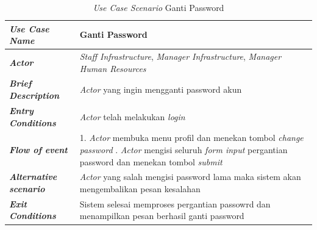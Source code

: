 \begin{longtable}{ |p{6cm}|p{8cm}|}
\caption{\textit{Use Case Scenario} Ganti Password}\label{tab:use-case-scenario-ganti-password} 
\\
\hline
\textbf{\textit{Use Case Name}}
&Ganti Password
\\ \hline

\textbf{\textit{Actor}}
&\textit{Staff Infrastructure}, \textit{Manager Infrastructure}, \textit{Manager Human Resources}
\\ \hline

\textbf{\textit{Brief Description}}
&\textit{Actor} yang ingin mengganti password akun
\\ \hline

\textbf{\textit{Entry Conditions}}
&\textit{Actor} telah melakukan \textit{login}
\\ \hline

\textbf{\textit{Flow of event}}
&1. \textit{Actor} membuka menu profil dan menekan tombol \textit{change password}
\newline
2. \textit{Actor} mengisi seluruh \textit{form input} pergantian password dan menekan tombol \textit{submit}
\newline
\\ \hline

\textbf{\textit{Alternative scenario}}
&\textit{Actor} yang salah mengisi password lama maka sistem akan mengembalikan pesan kesalahan
\\ \hline

\textbf{\textit{Exit Conditions}}
&Sistem selesai memproses pergantian passowrd dan menampilkan pesan berhasil ganti password
\\ \hline
\end{longtable}

